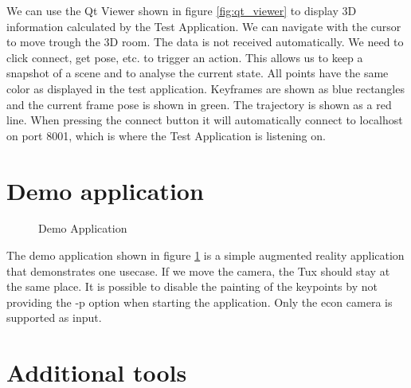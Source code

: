 \documentclass[11pt,a4paper,titlepage,oneside]{report}
\begin{document}
We can use the Qt Viewer shown in figure \ref{fig:qt_viewer} to display 3D information calculated by the Test Application. We can navigate with the cursor to move trough the 3D room. The data is not received automatically. We need to click connect, get pose, etc. to trigger an action. This allows us to keep a snapshot of a scene and to analyse the current state. All points have the same color as displayed in the test application. Keyframes are shown as blue rectangles and the current frame pose is shown in green. The trajectory is shown as a red line. When pressing the connect button it will automatically connect to localhost on port 8001, which is where the Test Application is listening on.

\section{Demo application}
\begin{figure}[H]
  \centering
  \qquad
  \caption{Demo Application}\label{fig:demo_application}
\end{figure}

The demo application shown in figure \ref{fig:demo_application} is a simple augmented reality application that demonstrates one usecase. If we move the camera, the Tux should stay at the same place. It is possible to disable the painting of the keypoints by not providing the -p option when starting the application. Only the econ camera is supported as input.

\section{Additional tools}
\end{document}
